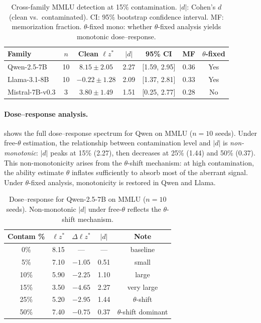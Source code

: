 \documentclass[11pt,a4paper]{article}
\begin{document}
\begin{table}[t]
\centering
\caption{Cross-family MMLU detection at 15\% contamination. $|d|$: Cohen's $d$ (clean vs.\ contaminated). CI: 95\% bootstrap confidence interval. MF: memorization fraction. $\theta$-fixed mono: whether $\theta$-fixed analysis yields monotonic dose--response.}
\label{tab:cross-family}
\small
\begin{tabular}{lcccccc}
\toprule
\textbf{Family} & $n$ & \textbf{Clean} $\ell z^*$ & $|d|$ & \textbf{95\% CI} & \textbf{MF} & $\theta$\textbf{-fixed} \\
\midrule
Qwen-2.5-7B & 10 & $8.15{\pm}2.05$ & 2.27 & [1.59, 2.95] & 0.36 & Yes \\
Llama-3.1-8B & 10 & $-0.22{\pm}1.28$ & 2.09 & [1.37, 2.81] & 0.33 & Yes \\
Mistral-7B-v0.3 & 3 & $3.80{\pm}1.49$ & 1.51 & [0.25, 2.77] & 0.28 & No \\
\bottomrule
\end{tabular}
\end{table}

\paragraph{Dose--response analysis.}
 shows the full dose--response spectrum for Qwen on MMLU ($n{=}10$ seeds).
Under free-$\theta$ estimation, the relationship between contamination level and $|d|$ is \emph{non-monotonic}: $|d|$ peaks at 15\% (2.27), then decreases at 25\% (1.44) and 50\% (0.37).
This non-monotonicity arises from the $\theta$-shift mechanism: at high contamination, the ability estimate $\theta$ inflates sufficiently to absorb most of the aberrant signal.
Under $\theta$-fixed analysis, monotonicity is restored in Qwen and Llama.

\begin{table}[t]
\centering
\caption{Dose--response for Qwen-2.5-7B on MMLU ($n{=}10$ seeds). Non-monotonic $|d|$ under free-$\theta$ reflects the $\theta$-shift mechanism.}
\label{tab:dose-response}
\small
\begin{tabular}{ccccc}
\toprule
\textbf{Contam \%} & $\ell z^*$ & $\Delta \ell z^*$ & $|d|$ & \textbf{Note} \\
\midrule
0\% & 8.15 & --- & --- & baseline \\
5\% & 7.10 & $-1.05$ & 0.51 & small \\
10\% & 5.90 & $-2.25$ & 1.10 & large \\
15\% & 3.50 & $-4.65$ & 2.27 & very large \\
25\% & 5.20 & $-2.95$ & 1.44 & $\theta$-shift \\
50\% & 7.40 & $-0.75$ & 0.37 & $\theta$-shift dominant \\
\bottomrule
\end{tabular}
\end{table}
\end{document}
